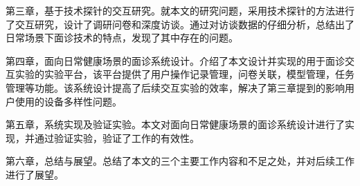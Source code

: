 第三章，基于技术探针的交互研究。就本文的研究问题，采用技术探针的方法进行了交互研究，设计了调研问卷和深度访谈。通过对访谈数据的仔细分析，总结出了日常场景下面诊技术的特点，发现了其中存在的问题。

第四章，面向日常健康场景的面诊系统设计。介绍了本文设计并实现的用于面诊交互实验的实验平台，该平台提供了用户操作记录管理，问卷关联，模型管理，任务管理等功能。该系统设计提高了后续交互实验的效率，解决了第三章提到的影响用户使用的设备多样性问题。

第五章，系统实现及验证实验。本文对面向日常健康场景的面诊系统设计进行了实现，并通过验证实验，验证了工作的有效性。

第六章，总结与展望。总结了本文的三个主要工作内容和不足之处，并对后续工作进行了展望。